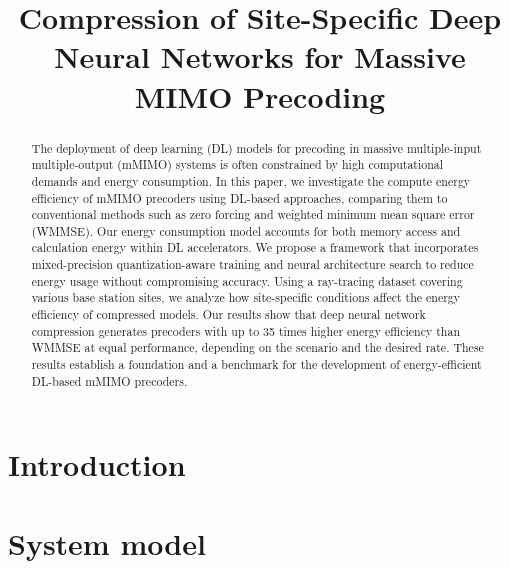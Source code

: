 \documentclass[conference]{IEEEtran}
\begin{document}
\title{Compression of Site-Specific Deep Neural Networks for Massive MIMO Precoding}
\author{
}

\maketitle
\IEEEpubidadjcol

\begin{abstract}
The deployment of deep learning (DL) models for precoding in massive multiple-input multiple-output (mMIMO) systems is often constrained by high computational demands and energy consumption. In this paper, we investigate the compute energy efficiency of mMIMO precoders using DL-based approaches, comparing them to conventional methods such as zero forcing and weighted minimum mean square error (WMMSE). Our energy consumption model accounts for both memory access and calculation energy within DL accelerators. We propose a framework that incorporates mixed-precision quantization-aware training and neural architecture search to reduce energy usage without compromising accuracy. Using a ray-tracing dataset covering various base station sites, we analyze how site-specific conditions affect the energy efficiency of compressed models. Our results show that deep neural network compression generates precoders with up to 35 times higher energy efficiency than WMMSE at equal performance, depending on the scenario and the desired rate. These results establish a foundation and a benchmark for the development of energy-efficient DL-based mMIMO precoders.
\end{abstract}





\section{Introduction} \label{Sec:Intro}


\section{System model} \label{Sec:Baseline}

\end{document}
